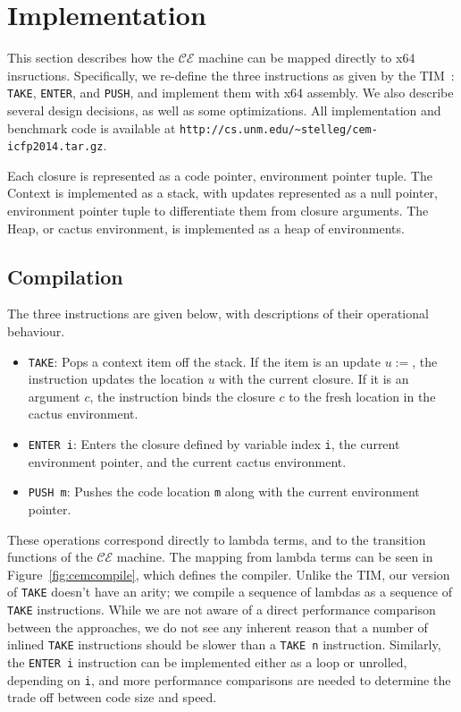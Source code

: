 \section{Implementation} \label{sec:impl}

This section describes how the $\mathcal{CE}$ machine can be mapped directly to
x64 insructions. Specifically, we re-define the three instructions as given by
the TIM~\cite{TIM}: \texttt{TAKE}, \texttt{ENTER}, and \texttt{PUSH}, and
implement them with x64 assembly. We also describe several design decisions, as
well as some optimizations. All implementation and benchmark code is available
at \texttt{http://cs.unm.edu/\textasciitilde stelleg/cem-icfp2014.tar.gz}.

Each closure is represented as a code pointer, environment pointer tuple. The
Context is implemented as a stack, with updates represented as a null pointer,
environment pointer tuple to differentiate them from closure arguments. The
Heap, or cactus environment, is implemented as a heap of environments. 

\subsection{Compilation}
The three instructions are given below, with descriptions of their operational
behaviour. 

\begin{itemize}
\item \texttt{TAKE}: Pops a context item off the stack. If the item is an
update $u:=$, the instruction updates the location $u$ with the current closure.
If it is an argument $c$, the instruction binds the closure $c$ to the fresh
location in the cactus environment.
\item \texttt{ENTER i}: Enters the closure defined by variable index \texttt{i},
the current environment pointer, and the current cactus environment.  \item
\texttt{PUSH m}: Pushes the code location \texttt{m} along with the
current environment pointer. 
\end{itemize}

These operations correspond directly to lambda terms, and to the transition
functions of the $\mathcal{CE}$ machine. The mapping from lambda terms can be
seen in Figure~\ref{fig:cemcompile}, which defines the compiler. Unlike the TIM,
our version of \texttt{TAKE} doesn't have an arity; we compile a sequence of
lambdas as a sequence of \texttt{TAKE} instructions. While we are not aware of a
direct performance comparison between the approaches, we do not see any inherent
reason that a number of inlined \texttt{TAKE} instructions should be slower than
a \texttt{TAKE n} instruction.  Similarly, the \texttt{ENTER i} instruction can
be implemented either as a loop or unrolled, depending on \texttt{i}, and more
performance comparisons are needed to determine the trade off between code size
and speed.

